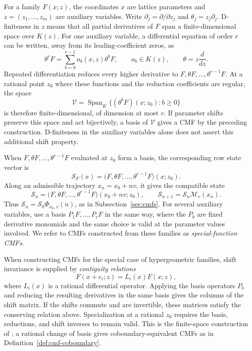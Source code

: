 \documentclass[oneside,english,11pt]{amsart}
\begin{document}
For a family $F(x;z)$, the coordinates $x$ are lattice parameters
and $z=(z_1,\ldots,z_m)$ are auxiliary variables.  Write
$\partial_j=\partial/\partial z_j$ and $\theta_j=z_j\partial_j$.
D-finiteness in $z$ means that all partial derivatives of $F$ span
a finite-dimensional space over $K(z)$.
For one auxiliary variable, a differential equation of order $r$ can
be written, away from its leading-coefficient zeros, as
\[
 \theta^rF=\sum_{b=0}^{r-1}a_b(x,z)\theta^bF,
 \qquad a_b\in K(z),\qquad \theta=z\frac{d}{dz}.
\]
Repeated differentiation reduces every higher derivative to
$F,\theta F,\ldots,\theta^{r-1}F$.  At a rational point $z_0$ where
these functions and the reduction coefficients are regular, the space
\[
 \mathcal V=\operatorname{Span}_K
 \{(\theta^bF)(x;z_0):b\ge0\}
\]
is therefore finite-dimensional, of dimension at most $r$.
If parameter shifts preserve this space and act bijectively, a basis
of $\mathcal V$ gives a CMF by the preceding construction.
D-finiteness in the auxiliary variables alone does not assert this
additional shift property.

When $F,\theta F,\ldots,\theta^{r-1}F$ evaluated at $z_0$
form a basis, the corresponding row state vector is
\[
 \mathcal S_F(x)=\bigl(F,\theta F,\ldots,\theta^{r-1}F\bigr)(x;z_0).
\]
Along an admissible trajectory $x_n=x_0+nv$, it gives the compatible state
\[
 \mathcal S_n=\bigl(F,\theta F,\ldots,\theta^{r-1}F\bigr)(x_0+nv;z_0),
 \qquad
 \mathcal S_{n+1}=\mathcal S_n\mathcal M_v(x_n).
\]
Thus $\mathcal S_n=\mathcal S_0\Phi_{x_0,v}(n)$, as in
Subsection~\ref{sec:cmfs}.  For several auxiliary variables, use
a basis $P_1F,\ldots,P_rF$ in the same way, where the $P_b$ are
fixed derivative monomials and the same choice is valid at the
parameter values involved.
We refer to CMFs constructed from these families as
\emph{special-function CMFs}.

When constructing CMFs for the special case of hypergeometric families, shift invariance is supplied by
\emph{contiguity relations}
\[
 F(x+e_i;z)=L_i(x)F(x;z),
\]
where $L_i(x)$ is a rational differential operator.
Applying the basis operators $P_b$ and reducing the resulting
derivatives in the same basis gives the columns of the shift matrix.
If the shifts commute and are invertible, these matrices satisfy
the conserving relation above.  Specialization at a rational $z_0$
requires the basis, reductions, and shift inverses to remain valid.
This is the finite-space construction of
\cite{weinbaum2025conservative}; a rational change of basis gives
coboundary-equivalent CMFs as in Definition~\ref{def:cmf-coboundary}.
\end{document}
